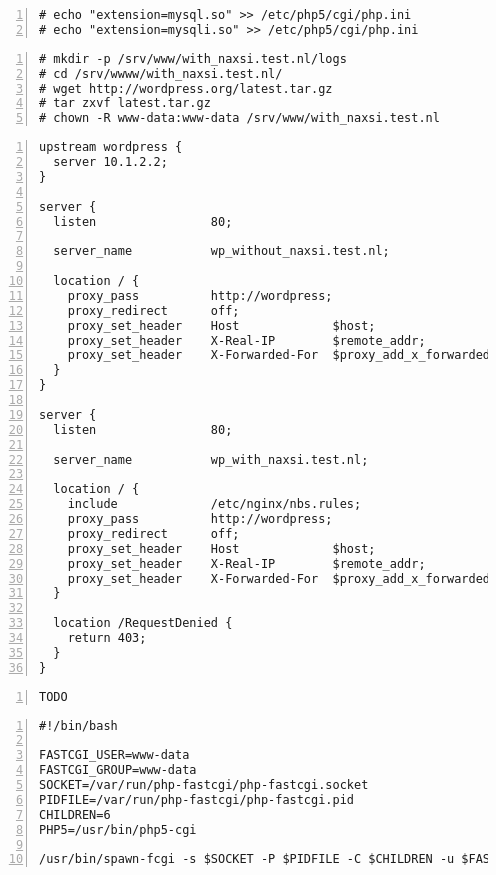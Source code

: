 \documentclass[Configuration]{subfiles}
\begin{document}
\begin{lstlisting}[frame=single,caption=/etc/php5/cgi/php.ini,backgroundcolor=\color{gray},breaklines=true,numbers=left,]
# echo "extension=mysql.so" >> /etc/php5/cgi/php.ini
# echo "extension=mysqli.so" >> /etc/php5/cgi/php.ini
\end{lstlisting}

\begin{lstlisting}[frame=single,caption=Wordpress 3.5.1 installation,backgroundcolor=\color{gray},breaklines=true,numbers=left,]
# mkdir -p /srv/www/with_naxsi.test.nl/logs
# cd /srv/wwww/with_naxsi.test.nl/
# wget http://wordpress.org/latest.tar.gz
# tar zxvf latest.tar.gz 
# chown -R www-data:www-data /srv/www/with_naxsi.test.nl
\end{lstlisting}

\begin{lstlisting}[frame=single,caption=/etc/nginx/sites-enabled/with\_wordpress,backgroundcolor=\color{gray},breaklines=true,numbers=left,]
upstream wordpress {
  server 10.1.2.2;
}

server {
  listen                80;

  server_name           wp_without_naxsi.test.nl;

  location / {
    proxy_pass          http://wordpress;
    proxy_redirect      off;
    proxy_set_header    Host             $host;
    proxy_set_header    X-Real-IP        $remote_addr;
    proxy_set_header    X-Forwarded-For  $proxy_add_x_forwarded_for;
  }
}

server {
  listen                80;

  server_name           wp_with_naxsi.test.nl;

  location / {
    include             /etc/nginx/nbs.rules;
    proxy_pass          http://wordpress;
    proxy_redirect      off;
    proxy_set_header    Host             $host;
    proxy_set_header    X-Real-IP        $remote_addr;
    proxy_set_header    X-Forwarded-For  $proxy_add_x_forwarded_for;
  }

  location /RequestDenied {
	return 403;
  }
}
\end{lstlisting}

\begin{lstlisting}[frame=single,caption=/etc/nginx/sites-enabled/with\_wordpress,backgroundcolor=\color{gray},breaklines=true,numbers=left,]
TODO
\end{lstlisting}

\begin{lstlisting}[frame=single,caption=/usr/bin/php-fastcgi (needs chmod +x /usr/bin/php-fastcgi),backgroundcolor=\color{gray},breaklines=true,numbers=left,]
#!/bin/bash

FASTCGI_USER=www-data
FASTCGI_GROUP=www-data
SOCKET=/var/run/php-fastcgi/php-fastcgi.socket
PIDFILE=/var/run/php-fastcgi/php-fastcgi.pid
CHILDREN=6
PHP5=/usr/bin/php5-cgi

/usr/bin/spawn-fcgi -s $SOCKET -P $PIDFILE -C $CHILDREN -u $FASTCGI_USER -g $FASTCGI_GROUP -f $PHP5
\end{lstlisting}
\end{document}
